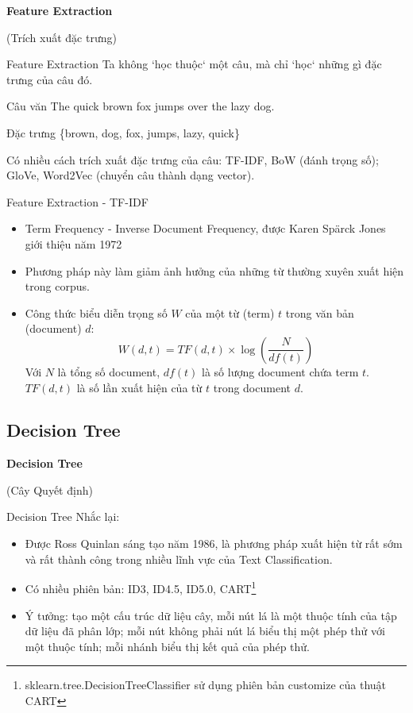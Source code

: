 \documentclass[aspectratio=169,xcolor=dvipsnames]{beamer}
\begin{document}
\begin{frame}
	\Huge{\centerline{\textbf{Feature Extraction}}}
	\centerline{(Trích xuất đặc trưng)}
\end{frame}

\begin{frame}{Feature Extraction}
Ta không `học thuộc` một câu, mà chỉ `học` những gì đặc trưng của câu đó.
\begin{block}{Câu văn}
The quick brown fox jumps over the lazy dog.
\end{block}

\begin{block}{Đặc trưng}
	\{brown, dog, fox, jumps, lazy, quick\}
\end{block}

Có nhiều cách trích xuất đặc trưng của câu: TF-IDF, BoW (đánh trọng số); GloVe, Word2Vec (chuyển câu thành dạng vector).
\end{frame}

\begin{frame}{Feature Extraction - TF-IDF}
\begin{itemize}
\item Term Frequency - Inverse Document Frequency, được  Karen Spärck Jones giới thiệu năm 1972\cite{Jones72astatistical}
\item Phương pháp này làm giảm ảnh hưởng của những từ thường xuyên xuất hiện trong corpus.
\item Công thức biểu diễn trọng số $W$ của một từ (term) $t$ trong văn bản (document) $d$:
$$
W(d, t) = TF(d, t) \times \log\left(\frac{N}{df(t)}\right)
$$
Với $N$ là tổng số document, $df(t)$ là số lượng document chứa term $t$. $TF(d, t)$ là số lần xuất hiện của từ $t$ trong document $d$.
\end{itemize}
\end{frame}

\subsection{Decision Tree}

\begin{frame}
	\Huge{\centerline{\textbf{Decision Tree}}}
	{\centerline{(Cây Quyết định)}}
\end{frame}

\begin{frame}{Decision Tree}
Nhắc lại:
\begin{itemize}
\item Được Ross Quinlan sáng tạo năm 1986\cite{DBLP:journals/ml/Quinlan86}, là phương pháp xuất hiện từ rất sớm và rất thành công trong nhiều lĩnh vực của Text Classification.
\item Có nhiều phiên bản: ID3, ID4.5, ID5.0, CART\footnote{sklearn.tree.DecisionTreeClassifier sử dụng phiên bản customize của thuật CART\cite{scikit-learn}}
\item Ý tưởng: tạo một cấu trúc dữ liệu cây, mỗi nút lá là một thuộc tính của tập dữ liệu đã phân lớp; mỗi nút không phải nút lá biểu thị một phép thử với một thuộc tính; mỗi nhánh biểu thị kết quả của phép thử.
\end{itemize}
\end{frame}
\end{document}
